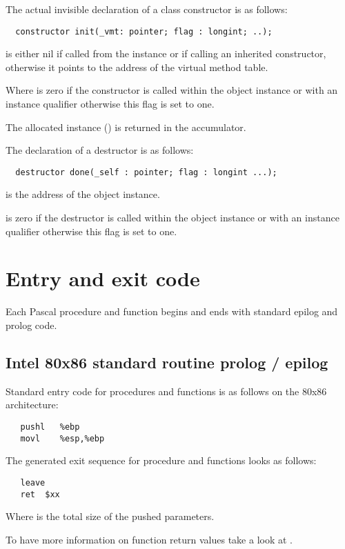 The actual invisible declaration of a class constructor
is as follows:

\begin{verbatim}
  constructor init(_vmt: pointer; flag : longint; ..);
\end{verbatim}

 is either nil if called from the instance
or if calling an inherited constructor, otherwise
it points to the address of the virtual method table.

Where  is zero if the constructor is called
within the object instance or with an instance qualifier
otherwise this flag is set to one. 

The allocated instance () is returned in the accumulator.


The declaration of a destructor is as follows:

\begin{verbatim}
  destructor done(_self : pointer; flag : longint ...);
\end{verbatim}

 is the address of the object instance.

 is zero if the destructor is called
within the object instance or with an instance qualifier
otherwise this flag is set to one.


\section{Entry and exit code}

Each Pascal procedure and function begins and ends with standard
epilog and prolog code.


\subsection{Intel 80x86 standard routine prolog / epilog}
Standard entry code for procedures and functions is as follows on the
80x86 architecture:
\begin{verbatim}
   pushl   %ebp
   movl    %esp,%ebp
\end{verbatim}

The generated exit sequence for procedure and functions looks as follows:
\begin{verbatim}
   leave
   ret  $xx
\end{verbatim}

Where  is the total size of the pushed parameters.

To have more information on function return values take a look at
.


